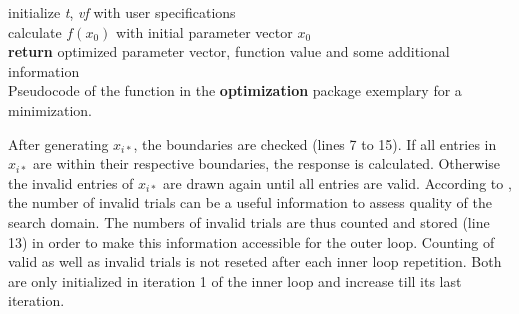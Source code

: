 \SetAlCapSkip{2ex}
\begin{algorithm}[H]
	initialize \textit{t}, \textit{vf} with user specifications\\
	calculate $f(x_0)$ with initial parameter vector $x_0$\\
	\textbf{return} optimized parameter vector, function value and some additional information \\
	\caption{Pseudocode of the  function in the \textbf{optimization} package exemplary for a minimization.}
	\label{alg:alg1}
\end{algorithm}

After generating $x_{i*}$, the boundaries are checked (lines 7 to 15). If all entries in $x_{i*}$ are within their respective boundaries, the response is calculated. Otherwise the invalid entries of $x_{i*}$ are drawn again until all entries are valid. According to \citet{corana_1987}, the number of invalid trials can be a useful information to assess quality of the search domain. The numbers of invalid trials are thus counted and stored (line 13) in order to make this information accessible for the outer loop. Counting of valid as well as invalid trials is not reseted after each inner loop repetition. Both are only initialized in iteration 1 of the inner loop and increase till its last iteration.

